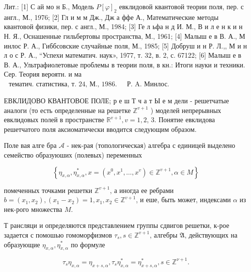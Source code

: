 \documentclass[10pt]{article}
\begin{document}
Лит.: [1] С ай мо н Б., Модель $P[\varphi]_{2}$ евклидовой квантовой теории поля, пер. с англ., М., 1976; [2] Гл и м м Дж., Дж а ффе А., Математические методы квантовой физики, пер. с англ., М., 1984; [3] Ге л ьфа н д И. М., В и л е н к и н Н. Я., Оснашенные гильбертовы пространства, М., 1961; [4] Малыш е в В. А., М инлос Р. А., Гиббсовские случайные поля, М., 1985; [5] Добруш и н Р. Л.,, М и н л о с Р. А., “Успехи математич. наук», 1977, т. 32, в. 2, с. 67122; [6] Малыш е в В. А., Ультрафиолетовые проблемы в теории поля, в кн.: Итоги науки и техники. Сер. Теория вероятн. и ма$\begin{array}{ll}\text { тематич. статистика, т. 24, М., 1986. } & \text { Р. A. Минлос. }\end{array}$



ЕВКЛИДОВО КВАНТОВОЕ ПОЛЕ; р е ш Т ч а т Ы е м дели - решетчатые аналоги (то есть определенные на решетке $\mathbb{Z}^{v+1}$ ) моделей непрерывных евклидовых полей в пространстве $\mathbb{R}^{v+1}, v=1,2$, 3. Понятие евклидова решетчатого поля аксиоматически вводится следующим образом.



Поле вая алге бра $\mathscr{A}$ - нек-рая (топологическая) алгебра с единицей выделено семейство образуюших (полевых) переменных



\[

\left\{\eta_{x, \alpha}, \eta_{x, \alpha}^{*}, x=\left(x^{0}, x^{1}, \ldots, x^{v}\right) \in \mathbb{Z}^{v+1}, \alpha \in M\right\}

\]



помеченных точками решетки $\mathbb{Z}^{v+1}$, а иногда ее ребрами $b=\left(x_{1}, x_{2}\right),\left(x_{1}-x_{2}\right)=1, x_{1}, x_{2} \in \mathbb{Z}^{v+1}$, и еше, быть может, индексами $\alpha$ из нек-рого множества $M$.



Т рансляци и определяются представлением группы сдвигов решетки, к-рое задается с помошью гомоморфизмов $\tau_{s}, s \in \mathbb{Z}^{v+1}$, алгебры $\mathfrak{A}$, действующих на образующие $\eta_{x, \alpha}, \eta_{x, \alpha}^{*}$ по формуле



\[

\tau_{s} \eta_{x, \alpha}=\eta_{x+s, \alpha}, \tau_{s} \eta_{x, \alpha}^{*}=\eta_{x+s, \alpha}^{*}, s \in \mathbb{Z}^{\nu+1} .

\]
\end{document}
